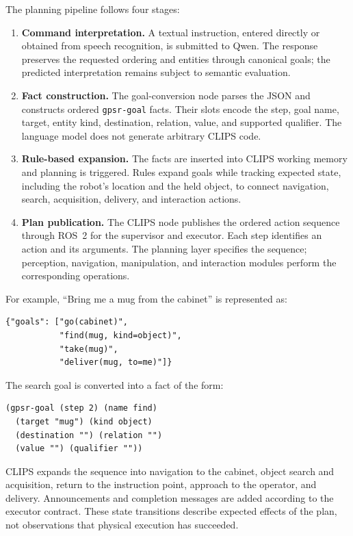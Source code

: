 The planning pipeline follows four stages:
\begin{enumerate}[leftmargin=*]
    \item \textbf{Command interpretation.} A textual instruction, entered directly or obtained from speech recognition, is submitted to Qwen. The response preserves the requested ordering and entities through canonical goals; the predicted interpretation remains subject to semantic evaluation.
    \item \textbf{Fact construction.} The goal-conversion node parses the JSON and constructs ordered \texttt{gpsr-goal} facts. Their slots encode the step, goal name, target, entity kind, destination, relation, value, and supported qualifier. The language model does not generate arbitrary CLIPS code.
    \item \textbf{Rule-based expansion.} The facts are inserted into CLIPS working memory and planning is triggered. Rules expand goals while tracking expected state, including the robot's location and the held object, to connect navigation, search, acquisition, delivery, and interaction actions.
    \item \textbf{Plan publication.} The CLIPS node publishes the ordered action sequence through ROS~2 for the supervisor and executor. Each step identifies an action and its arguments. The planning layer specifies the sequence; perception, navigation, manipulation, and interaction modules perform the corresponding operations.
\end{enumerate}

For example, ``Bring me a mug from the cabinet'' is represented as:
\begin{verbatim}
{"goals": ["go(cabinet)",
           "find(mug, kind=object)",
           "take(mug)",
           "deliver(mug, to=me)"]}
\end{verbatim}
The search goal is converted into a fact of the form:
\begin{verbatim}
(gpsr-goal (step 2) (name find)
  (target "mug") (kind object)
  (destination "") (relation "")
  (value "") (qualifier ""))
\end{verbatim}
CLIPS expands the sequence into navigation to the cabinet, object search and acquisition, return to the instruction point, approach to the operator, and delivery. Announcements and completion messages are added according to the executor contract. These state transitions describe expected effects of the plan, not observations that physical execution has succeeded.


